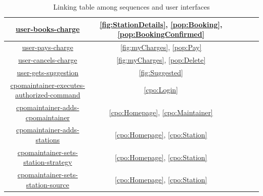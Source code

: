 \begin{table}[H]
\begin{center}
\begin{tabular}{|c||c|c|c|c|c|}
            \hyperref[fig:user-books-charge]{user-books-charge}                                                 & \ref{fig:StationDetails}, \ref{pop:Booking}, \ref{pop:BookingConfirmed}          \\\hline
            \hyperref[fig:user-pays-charge]{user-pays-charge}                                                   & \ref{fig:myCharges}, \ref{pop:Pay}                                               \\\hline
            \hyperref[fig:user-cancels-charge]{user-cancels-charge}                                             & \ref{fig:myCharges}, \ref{pop:Delete}                                            \\\hline
            \hyperref[fig:user-gets-suggestion]{user-gets-suggestion}                                           & \ref{fig:Suggested}                                                              \\\hline
            \hyperref[fig:cpomaintainer-executes-authorized-command]{cpomaintainer-executes-authorized-command} & \ref{cpo:Login}                                                                  \\\hline
            \hyperref[fig:cpomaintainer-adds-cpomaintainer]{cpomaintainer-adds-cpomaintainer}                   & \ref{cpo:Homepage}, \ref{cpo:Maintainer}                                         \\\hline
            \hyperref[fig:cpomaintainer-adds-stations]{cpomaintainer-adds-stations}                             & \ref{cpo:Homepage}, \ref{cpo:Station}                                            \\\hline
            \hyperref[fig:cpomaintainer-sets-station-strategy]{cpomaintainer-sets-station-strategy}             & \ref{cpo:Homepage}, \ref{cpo:Station}                                            \\\hline
            \hyperref[fig:cpomaintainer-sets-station-source]{cpomaintainer-sets-station-source}                 & \ref{cpo:Homepage}, \ref{cpo:Station}                                            \\\hline
        \end{tabular}
    \end{center}
    \caption{Linking table among sequences and user interfaces}
\end{table}
\clearpage